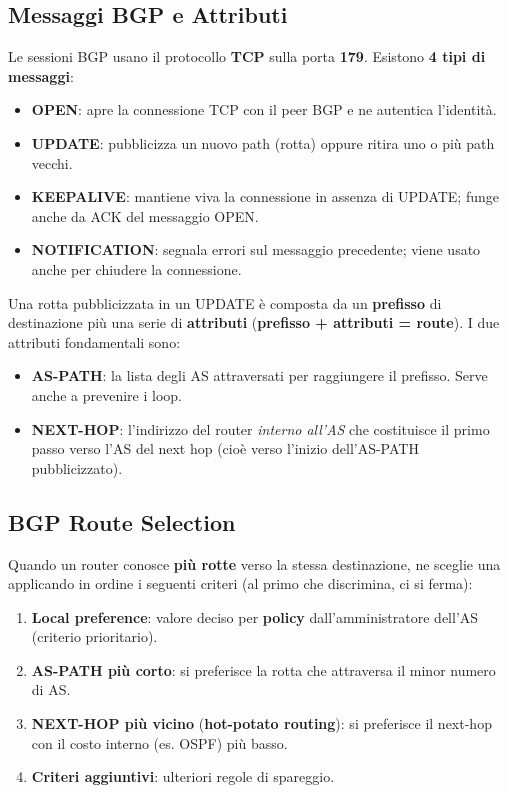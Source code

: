 \subsection{Messaggi BGP e Attributi}
Le sessioni BGP usano il protocollo \textbf{TCP} sulla porta \textbf{179}. Esistono \textbf{4 tipi di messaggi}:
\begin{itemize}
    \item \textbf{OPEN}: apre la connessione TCP con il peer BGP e ne autentica l'identità.
    \item \textbf{UPDATE}: pubblicizza un nuovo path (rotta) oppure ritira uno o più path vecchi.
    \item \textbf{KEEPALIVE}: mantiene viva la connessione in assenza di UPDATE; funge anche da ACK del messaggio OPEN.
    \item \textbf{NOTIFICATION}: segnala errori sul messaggio precedente; viene usato anche per chiudere la connessione.
\end{itemize}

Una rotta pubblicizzata in un UPDATE è composta da un \textbf{prefisso} di destinazione più una serie di \textbf{attributi} (\textbf{prefisso + attributi = route}). I due attributi fondamentali sono:
\begin{itemize}
    \item \textbf{AS-PATH}: la lista degli AS attraversati per raggiungere il prefisso. Serve anche a prevenire i loop.
    \item \textbf{NEXT-HOP}: l'indirizzo del router \textit{interno all'AS} che costituisce il primo passo verso l'AS del next hop (cioè verso l'inizio dell'AS-PATH pubblicizzato).
\end{itemize}

\subsection{BGP Route Selection}
Quando un router conosce \textbf{più rotte} verso la stessa destinazione, ne sceglie una applicando in ordine i seguenti criteri (al primo che discrimina, ci si ferma):
\begin{enumerate}
    \item \textbf{Local preference}: valore deciso per \textbf{policy} dall'amministratore dell'AS (criterio prioritario).
    \item \textbf{AS-PATH più corto}: si preferisce la rotta che attraversa il minor numero di AS.
    \item \textbf{NEXT-HOP più vicino} (\textbf{hot-potato routing}): si preferisce il next-hop con il costo interno (es. OSPF) più basso.
    \item \textbf{Criteri aggiuntivi}: ulteriori regole di spareggio.
\end{enumerate}

